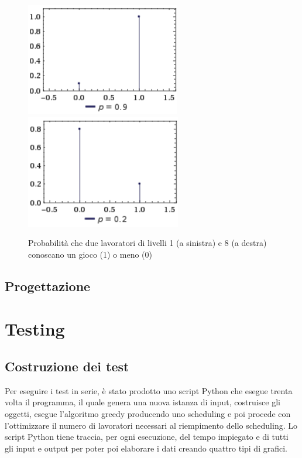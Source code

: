      \begin{figure}[!htb]
         \begin{widepage}
             \centering
             \includegraphics[width=.49\textwidth]{../immagini/livello_1.png}\hfil
             \includegraphics[width=.49\textwidth]{../immagini/livello_8.png}
             \caption{Probabilità che due lavoratori di livelli 1 (a sinistra) e 8 (a destra) conoscano un gioco (1) o meno (0)}
         \end{widepage}
     \end{figure}
 \clearpage
\subsection{Progettazione}
\section{Testing}
\subsection{Costruzione dei test}
Per eseguire i test in serie, è stato prodotto uno script Python che esegue trenta volta il programma, il quale genera una nuova istanza di input, costruisce gli oggetti, esegue l'algoritmo greedy producendo uno scheduling e poi procede con l'ottimizzare il numero di lavoratori necessari al riempimento dello scheduling. Lo script Python tiene traccia, per ogni esecuzione, del tempo impiegato e di tutti gli input e output per poter poi elaborare i dati creando quattro tipi di grafici.
